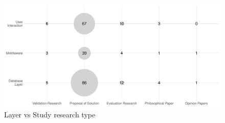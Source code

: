\begin{figure}[hptb]
    \centering
    \includegraphics[width=\textwidth]{images/3_mapping/layer_vs_type}
    \caption{ Layer vs Study research type}
    \label{fig:mapping/layer_vs_type}
\end{figure}

